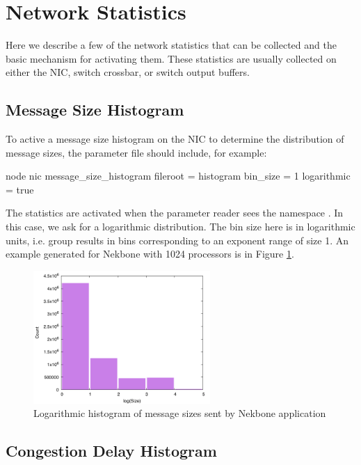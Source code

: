 

\section{Network Statistics}
\label{sec:tutorials:packetStats}

Here we describe a few of the network statistics that can be collected and the basic mechanism for activating them.
These statistics are usually collected on either the NIC, switch crossbar, or switch output buffers.

\subsection{Message Size Histogram}
\label{subsec:messageSizeHistogram}
To active a message size histogram on the NIC to determine the distribution of message sizes, the parameter file should include, for example:

\begin{ViFile}
node {
 nic {
  message_size_histogram {
   fileroot = histogram
   bin_size = 1
   logarithmic = true
  }
 } 
}
\end{ViFile}
The statistics are activated when the parameter reader sees the namespace .
In this case, we ask for a logarithmic distribution.
The bin size here is in logarithmic units, i.e. group results in bins corresponding to an exponent range of size 1.
An example generated for Nekbone with 1024 processors is in Figure \ref{fig:nekboneSizeHistogram}.

\begin{figure}
\centering
\includegraphics[width=0.6\textwidth]{figures/messageSizeHistogramNekbone}
\caption{Logarithmic histogram of message sizes sent by Nekbone application}
\label{fig:nekboneSizeHistogram}
\end{figure}

\subsection{Congestion Delay Histogram}
\label{subsec:congestionDelayHistogram}

